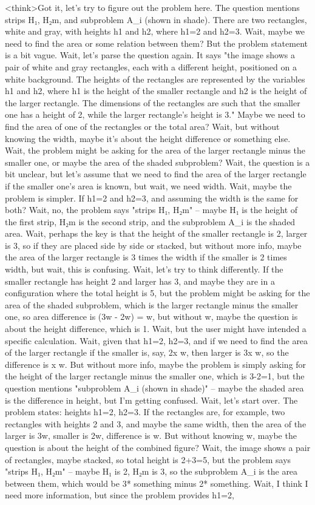 <think>Got it, let's try to figure out the problem here. The question mentions strips H₁, H₂m, and subproblem A_i (shown in shade). There are two rectangles, white and gray, with heights h1 and h2, where h1=2 and h2=3. Wait, maybe we need to find the area or some relation between them? But the problem statement is a bit vague. Wait, let's parse the question again. It says "the image shows a pair of white and gray rectangles, each with a different height, positioned on a white background. The heights of the rectangles are represented by the variables h1 and h2, where h1 is the height of the smaller rectangle and h2 is the height of the larger rectangle. The dimensions of the rectangles are such that the smaller one has a height of 2, while the larger rectangle's height is 3." Maybe we need to find the area of one of the rectangles or the total area? Wait, but without knowing the width, maybe it's about the height difference or something else. Wait, the problem might be asking for the area of the larger rectangle minus the smaller one, or maybe the area of the shaded subproblem? Wait, the question is a bit unclear, but let's assume that we need to find the area of the larger rectangle if the smaller one's area is known, but wait, we need width. Wait, maybe the problem is simpler. If h1=2 and h2=3, and assuming the width is the same for both? Wait, no, the problem says "strips H₁, H₂m" – maybe H₁ is the height of the first strip, H₂m is the second strip, and the subproblem A_i is the shaded area. Wait, perhaps the key is that the height of the smaller rectangle is 2, larger is 3, so if they are placed side by side or stacked, but without more info, maybe the area of the larger rectangle is 3 times the width if the smaller is 2 times width, but wait, this is confusing. Wait, let's try to think differently. If the smaller rectangle has height 2 and larger has 3, and maybe they are in a configuration where the total height is 5, but the problem might be asking for the area of the shaded subproblem, which is the larger rectangle minus the smaller one, so area difference is (3w - 2w) = w, but without w, maybe the question is about the height difference, which is 1. Wait, but the user might have intended a specific calculation. Wait, given that h1=2, h2=3, and if we need to find the area of the larger rectangle if the smaller is, say, 2x w, then larger is 3x w, so the difference is x w. But without more info, maybe the problem is simply asking for the height of the larger rectangle minus the smaller one, which is 3-2=1, but the question mentions "subproblem A_i (shown in shade)" – maybe the shaded area is the difference in height, but I'm getting confused. Wait, let's start over. The problem states: heights h1=2, h2=3. If the rectangles are, for example, two rectangles with heights 2 and 3, and maybe the same width, then the area of the larger is 3w, smaller is 2w, difference is w. But without knowing w, maybe the question is about the height of the combined figure? Wait, the image shows a pair of rectangles, maybe stacked, so total height is 2+3=5, but the problem says "strips H₁, H₂m" – maybe H₁ is 2, H₂m is 3, so the subproblem A_i is the area between them, which would be 3* something minus 2* something. Wait, I think I need more information, but since the problem provides h1=2, 